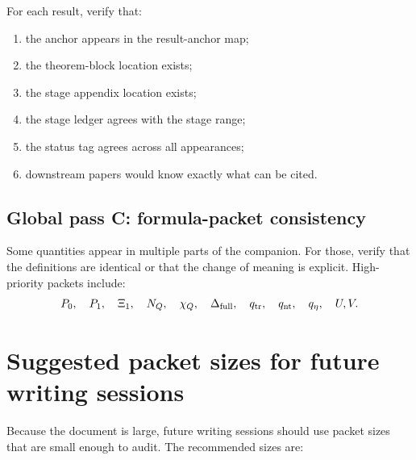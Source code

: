For each  result, verify that:

\begin{enumerate}[leftmargin=2.0em]
\item the anchor appears in the result-anchor map;
\item the theorem-block location exists;
\item the stage appendix location exists;
\item the stage ledger agrees with the stage range;
\item the status tag agrees across all appearances;
\item downstream papers would know exactly what can be cited.
\end{enumerate}

\subsection{Global pass C: formula-packet consistency}
\label{subsec:global-pass-formula-packet-consistency}

Some quantities appear in multiple parts of the companion.  For those, verify that the definitions are identical or that the change of meaning is explicit.  High-priority packets include:
\[
P_0,\quad P_1,\quad \Xi_1,\quad N_Q,\quad \chi_Q,
\quad \Delta_{\rm full},\quad q_{\rm tr},\quad q_{\rm nt},\quad q_\eta,
\quad U,V.
\]

\section{Suggested packet sizes for future writing sessions}
\label{sec:suggested-packet-sizes}

Because the document is large, future writing sessions should use packet sizes that are small enough to audit.  The recommended sizes are:

